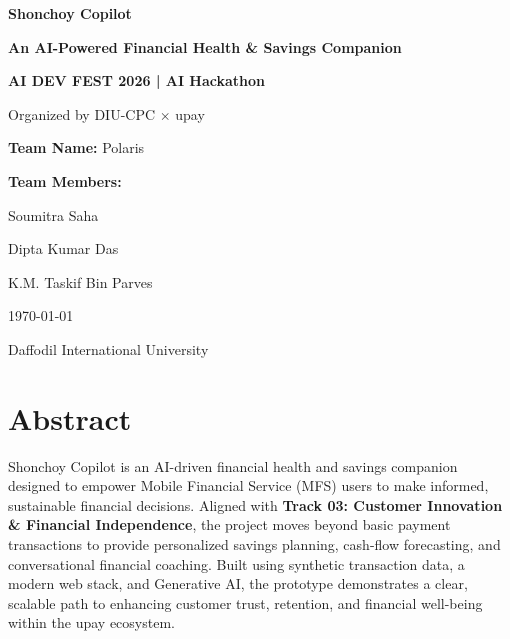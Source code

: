 \documentclass[11pt, a4paper]{article}
\begin{document}
\begin{titlepage}
    \centering
    \vspace*{2cm}
    {\Huge\bfseries Shonchoy Copilot\par}
    \vspace{0.5cm}
    {\Large\bfseries An AI-Powered Financial Health \& Savings Companion\par}
    \vspace{1.5cm}
    {\Large\textbf{AI DEV FEST 2026 | AI Hackathon}\par}
    \vspace{0.5cm}
    {\large Organized by DIU-CPC $\times$ upay\par}
    \vspace{1.5cm}
    {\Large\textbf{Team Name:} Polaris\par}
    \vspace{1cm}
    {\large\textbf{Team Members:}\par}
    \vspace{0.3cm}
    
    {\large Soumitra Saha\par}
    {\large Dipta Kumar Das\par}
    {\large K.M. Taskif Bin Parves\par}
    \vspace{1.5cm}
    {\large \today\par}
    \vfill
    {\large Daffodil International University\par}
\end{titlepage}

\tableofcontents
\newpage

\section*{Abstract}
Shonchoy Copilot is an AI-driven financial health and savings companion designed to empower Mobile Financial Service (MFS) users to make informed, sustainable financial decisions. Aligned with \textbf{Track 03: Customer Innovation \& Financial Independence}, the project moves beyond basic payment transactions to provide personalized savings planning, cash-flow forecasting, and conversational financial coaching. Built using synthetic transaction data, a modern web stack, and Generative AI, the prototype demonstrates a clear, scalable path to enhancing customer trust, retention, and financial well-being within the upay ecosystem.
\end{document}
